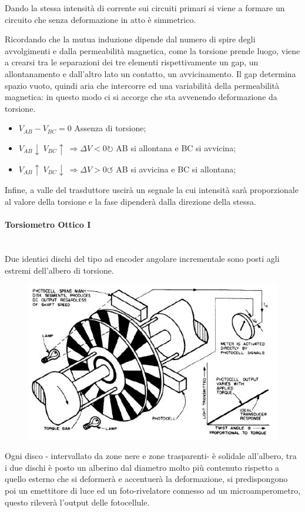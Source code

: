 \documentclass[a4paper, 15pt]{article}
\begin{document}
\begin{adjustwidth}{2in}{}
  		Dando la stessa intensità di corrente sui circuiti primari si viene a formare un circuito che senza deformazione in atto è simmetrico. 
  		
  		Ricordando che la mutua induzione dipende dal numero di spire degli avvolgimenti e dalla permeabilità magnetica, come la torsione prende luogo, viene a crearsi tra le separazioni dei tre elementi rispettivamente un gap, un allontanamento e dall'altro lato un contatto, un avvicinamento. Il gap determina spazio vuoto, quindi aria che intercorre ed una variabilità della permeabilità magnetica: in questo modo ci si accorge che sta avvenendo deformazione da torsione. \newline 
  		
  		\begin{itemize}
  			\item \(V_{AB} - V_{BC} = 0 \) Assenza di torsione;
  			\item \( V_{AB}\downarrow ~ V_{BC}\uparrow ~ \Rightarrow \Delta V<0 \circlearrowright\) AB si allontana e BC si avvicina;
  			\item \( V_{AB}\uparrow ~ V_{BC}\downarrow ~ \Rightarrow \Delta V>0 \circlearrowleft\) AB si avvicina e BC si allontana;
  		\end{itemize}
  		
  		Infine, a valle del trasduttore uscirà un segnale la cui intensità sarà proporzionale al valore della torsione e la fase dipenderà dalla direzione della stessa.  
  		
\paragraph{Torsiometro Ottico I}\mbox{} \\ 
  		Due identici dischi del tipo ad encoder angolare incrementale sono posti agli
  		estremi dell'albero di torsione. 
  		\begin{figure}[H]
  			\centering
  			\includegraphics[width=0.5\linewidth]{immagini/21}
  			\label{fig:21}
  		\end{figure}  
  		Ogni disco - intervallato da zone nere e zone trasparenti- è solidale all'albero, tra i due dischi è posto un alberino dal diametro molto più contenuto rispetto a quello esterno che si deformerà e accentuerà la deformazione, si predispongono poi un emettitore di luce ed un foto-rivelatore connesso ad un microamperometro, questo rileverà l'output delle fotocellule. \newline 
  		

\end{adjustwidth}
\end{document}
